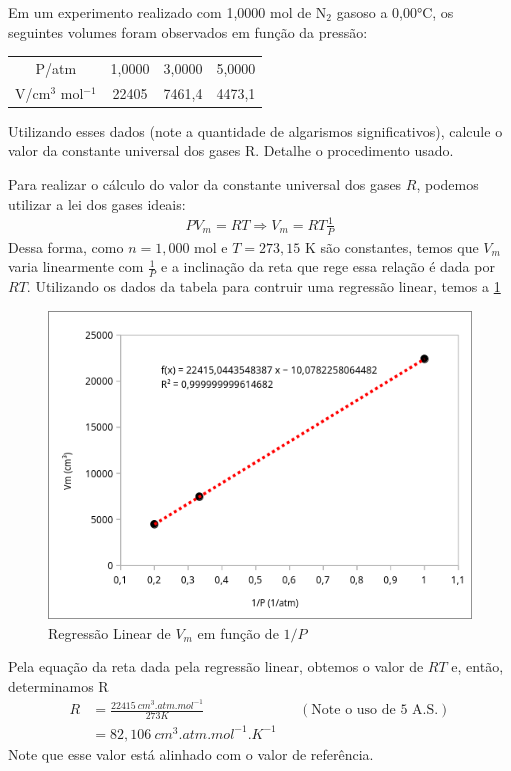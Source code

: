 \begin{xcs}
    Em um experimento realizado com 1,0000 mol de N\(_2\) gasoso a 0,00°C, os
    seguintes volumes foram observados em função da pressão: 
    \begin{center}
    \begin{tabular}{c | c c c}
    \hline
        P/atm & 1,0000 & 3,0000 & 5,0000\\
        V/cm\(^3\) mol\(^{-1}\) & 22405 & 7461,4 & 4473,1\\
    \hline
    \end{tabular}
    \end{center}
    Utilizando esses dados (note a quantidade de algarismos significativos),
    calcule o valor da constante universal dos gases R. Detalhe o procedimento
    usado.
\end{xcs}
\begin{rsl}
    
    Para realizar o cálculo do valor da constante universal dos gases \( R \),
    podemos utilizar a lei dos gases ideais: 
    \begin{align*}
        PV_m = RT \Rightarrow 
        V_m = RT \frac{1}{P} 
    \end{align*}
    Dessa forma, como \( n = 1,000 \) mol e \( T = 273,15 \) K são constantes,
    temos que \( V_m \) varia linearmente com \( \frac{1}{P} \) e a inclinação
    da reta que rege essa relação é dada por \( RT \). Utilizando os dados
    da tabela para contruir uma regressão linear, temos a \cref{reggeo} 
    \begin{figure}[H]
        \centering
        \includegraphics[width=.4\linewidth]{images/geo1.png}
        \caption{Regressão Linear de \(V_m\) em função de \( 1/P \) }
        \label{reggeo}
    \end{figure}
    Pela equação da reta dada pela regressão linear, obtemos o valor de \( RT \)
    e, então, determinamos R
    \begin{align*}
        R &= \frac{22415 \ \unit{cm^3.atm.mol^{-1}} }{273K} && (\text{Note o uso
        de 5 A.S.})\\
        &= 82,106 \ \unit{cm^3.atm.mol^{-1}.K^{-1}}
    \end{align*}
    Note que esse valor está alinhado com o valor de referência.
    
\end{rsl}
